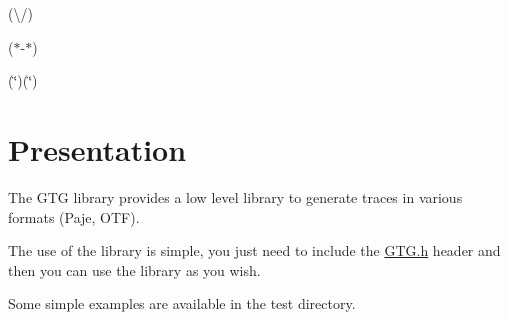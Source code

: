 (\textbackslash{}/) \par
 ($\ast$-\/$\ast$) \par
 (\char`\"{})(\char`\"{}) \par
\hypertarget{index_Presentation}{}\section{Presentation}\label{index_Presentation}
The G\-T\-G library provides a low level library to generate traces in various formats (Paje, O\-T\-F). \par
 The use of the library is simple, you just need to include the \hyperlink{GTG_8h}{G\-T\-G.\-h} header and then you can use the library as you wish. \par
 Some simple examples are available in the test directory. \par
 